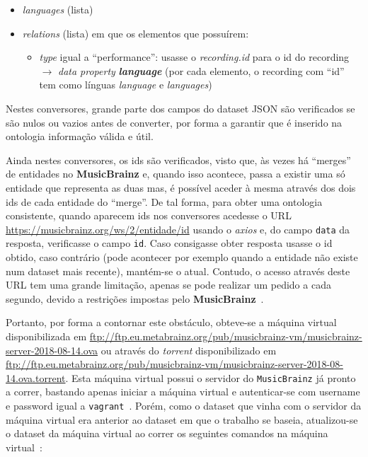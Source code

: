 \documentclass{article}
\begin{document}
\begin{itemize}
\begin{itemize}
            \item \textit{languages} (lista)
            \item \textit{relations} (lista) em que os elementos que possuírem:
                \begin{itemize}
                    \item \textit{type} igual a ``performance'': usasse o \textit{recording.id} para o id do recording $\to$ \textit{data property} \textit{\textbf{language}} (por cada elemento, o recording com ``id'' tem como línguas \textit{language} e \textit{languages})
                \end{itemize}
        \end{itemize}
\end{itemize}

Nestes conversores, grande parte dos campos do dataset JSON são verificados se são nulos ou vazios antes de converter, por forma a garantir que é inserido na ontologia informação válida e útil.

Ainda nestes conversores, os ids são verificados, visto que, às vezes há ``merges'' de entidades no \textbf{MusicBrainz} e, quando isso acontece, passa a existir uma só entidade que representa as duas mas, é possível aceder à mesma através dos dois ids de cada entidade do ``merge''. De tal forma, para obter uma ontologia consistente, quando aparecem ids nos conversores acedesse o URL \url{https://musicbrainz.org/ws/2/entidade/id} usando o \textit{axios} e, do campo \texttt{data} da resposta, verificasse o campo \texttt{id}. Caso consigasse obter resposta usasse o id obtido, caso contrário (pode acontecer por exemplo quando a entidade não existe num dataset mais recente), mantém-se o atual. Contudo, o acesso através deste URL tem uma grande limitação, apenas se pode realizar um pedido a cada segundo, devido a restrições impostas pelo \textbf{MusicBrainz}~\cite{mbLimit}. 

Portanto, por forma a contornar este obstáculo, obteve-se a máquina virtual disponibilizada em \url{ftp://ftp.eu.metabrainz.org/pub/musicbrainz-vm/musicbrainz-server-2018-08-14.ova} ou através do \textit{torrent} disponibilizado em \url{ftp://ftp.eu.metabrainz.org/pub/musicbrainz-vm/musicbrainz-server-2018-08-14.ova.torrent}. Esta máquina virtual possui o servidor do \texttt{MusicBrainz} já pronto a correr, bastando apenas iniciar a máquina virtual e autenticar-se com username e password igual a \texttt{vagrant}~\cite{mbSetup}. Porém, como o dataset que vinha com o servidor da máquina virtual era anterior ao dataset em que o trabalho se baseia, atualizou-se o dataset da máquina virtual ao correr os seguintes comandos na máquina virtual~\cite{mbUpdate}:
\end{document}
